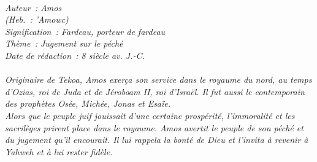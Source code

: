 \BFont
\noindent\hrulefill
{\footnotesize
\textit{
\bigskip
{\centering{}
\\Auteur~: Amos
\\(Heb.~: 'Amowc)
\\Signification~: Fardeau, porteur de fardeau
\\Thème~: Jugement sur le péché
\\Date de rédaction~: 8 siècle av. J.-C.\\}
}
\textit{
\\Originaire de Tekoa, Amos exerça son service dans le royaume du nord, au temps d'Ozias, roi de Juda et de Jéroboam II, roi d'Israël. Il fut aussi le contemporain des prophètes Osée, Michée, Jonas et Esaïe.
\\Alors que le peuple juif jouissait d'une certaine prospérité, l'immoralité et les sacrilèges prirent place dans le royaume. Amos avertit le peuple de son péché et du jugement qu'il encourait. Il lui rappela la bonté de Dieu et l'invita à revenir à Yahweh et à lui rester fidèle.\bigskip
}
}
\par\nobreak\noindent\hrulefill
